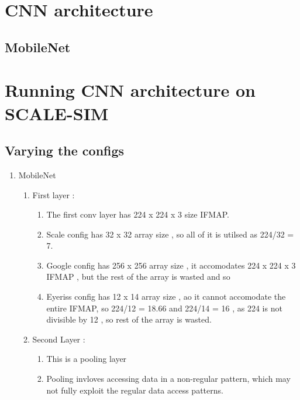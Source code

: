 \documentclass[12pt]{article}
\begin{document}


\section{CNN architecture}

\subsection{MobileNet}


\section{Running CNN architecture on SCALE-SIM}

\subsection{Varying the configs}

\begin{enumerate}
    \item MobileNet
    \begin{enumerate}
        \item First layer : 
        \begin{enumerate}
            \item The first conv layer has 224 x 224 x 3 size IFMAP.
            \item Scale config has 32 x 32 array size , so all of it is utilsed  as 224/32 = 7.
            \item Google config has 256 x 256 array size , it accomodates 224 x 224 x 3 IFMAP , but the rest of the array is wasted and so 
            \item Eyeriss config has 12 x 14 array size , ao it cannot accomodate the entire IFMAP, so 224/12 = 18.66 and 224/14 = 16 , as 224 is not divisible by 12 , so rest of the array is wasted.
        \end{enumerate}

        \item Second Layer : 
        \begin{enumerate}
            \item This is a pooling layer
            \item Pooling invloves accessing data in a non-regular pattern, which may not fully exploit the regular data access patterns.
        \end{enumerate}
    \end{enumerate}

    
\end{enumerate}
\end{document}
